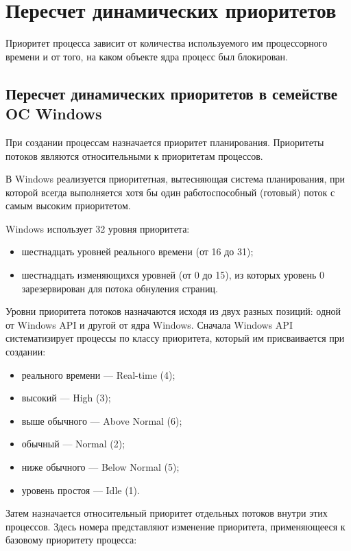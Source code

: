 \chapter{Пересчет динамических приоритетов}

Приоритет процесса зависит от количества используемого им процессорного времени и от того, на каком объекте ядра процесс был блокирован.

\section{Пересчет динамических приоритетов в семействе OC Windows}

При создании процессам назначается приоритет планирования. Приоритеты потоков являются относительными к приоритетам процессов.

В Windows реализуется приоритетная, вытесняющая система планирования, при которой всегда выполняется хотя бы один работоспособный (готовый) поток с самым высоким приоритетом.

Windows использует 32 уровня приоритета:

\begin{itemize}[label*=--]
	\item шестнадцать уровней реального времени (от 16 до 31);
	\item шестнадцать изменяющихся уровней (от 0 до 15), из которых уровень 0 зарезервирован для потока обнуления страниц.
\end{itemize}


Уровни приоритета потоков назначаются исходя из двух разных позиций:
одной от Windows API и другой от ядра Windows. 
Сначала Windows API систематизирует процессы по классу приоритета, который им присваивается при создании:

\begin{itemize}[label*=--]
	\item реального времени --- Real-time (4);
	\item высокий --- High (3);
	\item выше обычного --- Above Normal (6);
	\item обычный --- Normal (2);
	\item ниже обычного --- Below Normal (5);
	\item уровень простоя --- Idle (1).
\end{itemize}

Затем назначается относительный приоритет отдельных потоков внутри этих процессов. 
Здесь номера представляют изменение приоритета, применяющееся к базовому приоритету процесса:

